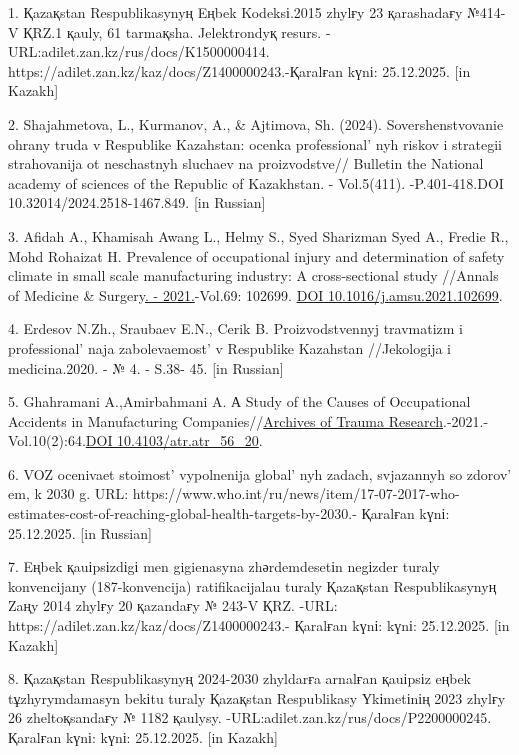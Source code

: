 \begin{refs}
1. Қazaқstan Respublikasynyң Eңbek Kodeksі.2015 zhylғy 23 қarashadaғy
№414-V ҚRZ.1 қauly, 61 tarmaқsha. Jelektrondyқ resurs.
-URL:adilet.zan.kz/rus/docs/K1500000414.
https://adilet.zan.kz/kaz/docs/Z1400000243.-Қaralғan kүnі: 25.12.2025.
{[}in Kazakh{]}

2. Shajahmetova, L., Kurmanov, A., \& Ajtimova, Sh. (2024).
Sovershenstvovanie ohrany truda v Respublike Kazahstan: ocenka
professional' nyh riskov i strategii strahovanija ot
neschastnyh sluchaev na proizvodstve// Bulletin the National academy of
sciences of the Republic of Kazakhstan. - Vol.5(411). -P.401-418.DOI
10.32014/2024.2518-1467.849. {[}in Russian{]}

3. Afidah A., Khamisah Awang L., Helmy S., Syed Sharizman Syed A.,
Fredie R., Mohd Rohaizat H. Prevalence of occupational injury and
determination of safety climate in small scale manufacturing industry: A
cross-sectional study //Annals of Medicine \&
Surgery\href{file:///C:/Users/admin/Downloads/69.\%20-\%20September\%202021}{.
- 2021.}-Vol.69: 102699.
\href{https://doi.org/10.1016/j.amsu.2021.102699}{DOI
10.1016/j.amsu.2021.102699}.

4. Erdesov N.Zh., Sraubaev E.N., Cerik B. Proizvodstvennyj travmatizm i
professional' naja zabolevaemost'{} v
Respublike Kazahstan //Jekologija i medicina.2020. - № 4. - S.38- 45.
{[}in Russian{]}

5. Ghahramani A.,Amirbahmani A. А Study of the Causes of Occupational
Accidents in Manufacturing
Companies//\href{https://www.researchgate.net/journal/Archives-of-Trauma-Research-2251-9599?_tp=eyJjb250ZXh0Ijp7ImZpcnN0UGFnZSI6InB1YmxpY2F0aW9uIiwicGFnZSI6InB1YmxpY2F0aW9uIn19}{Archives
of Trauma
Research}.-2021.-Vol.10(2):64.\href{https://doi.org/10.4103/atr.atr_56_20}{DOI
10.4103/atr.atr\_56\_20}.

6. VOZ ocenivaet stoimost'{} vypolnenija
global' nyh zadach, svjazannyh so
zdorov' em, k 2030 g. URL:
https://www.who.int/ru/news/item/17-07-2017-who-estimates-cost-of-reaching-global-health-targets-by-2030.-
Қaralғan kүnі: 25.12.2025. {[}in Russian{]}

7. Eңbek қauіpsіzdіgі men gigienasyna zhәrdemdesetіn negіzder turaly
konvencijany (187-konvencija) ratifikacijalau turaly Қazaқstan
Respublikasynyң Zaңy 2014 zhylғy 20 қazandaғy № 243-V ҚRZ. -URL:
https://adilet.zan.kz/kaz/docs/Z1400000243.- Қaralғan kүnі: kүnі:
25.12.2025. {[}in Kazakh{]}

8. Қazaқstan Respublikasynyң 2024-2030 zhyldarғa arnalғan қauіpsіz eңbek
tұzhyrymdamasyn bekіtu turaly Қazaқstan Respublikasy Үkіmetіnің 2023
zhylғy 26 zheltoқsandaғy № 1182 қaulysy.
-URL:adilet.zan.kz/rus/docs/P2200000245. Қaralғan kүnі: kүnі:
25.12.2025. {[}in Kazakh{]}


\end{refs}
